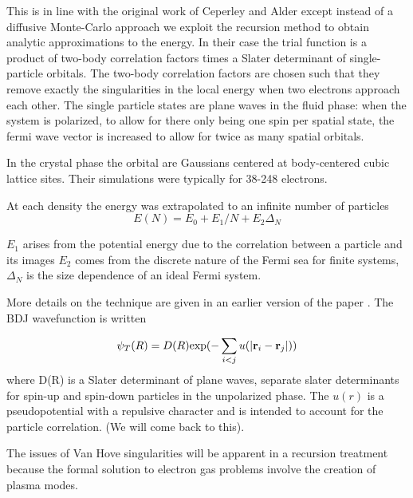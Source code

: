 \documentclass{article}
\def\r{{\bf r}}
\begin{document}
This is in line with the original work of Ceperley and Alder \cite{ceperley80} except 
instead of a diffusive Monte-Carlo approach we exploit the
recursion method to obtain analytic approximations to the energy.
In their case the trial function is a product
of two-body correlation factors times a Slater determinant of 
single-particle orbitals. The two-body correlation factors are
chosen such that they remove exactly the singularities in the local energy when two electrons
approach each other. The single particle states are plane waves
in the fluid phase: when the system is polarized, to allow for there only being
one spin per spatial state, the fermi wave vector is increased to allow
for twice as many spatial orbitals. 

In the crystal phase the orbital are Gaussians centered 
at body-centered cubic lattice sites. Their simulations were typically 
for 38-248 electrons.

At each density the energy was extrapolated to an infinite number of particles
%
\begin{equation}
E(N) = E_{0} + E_{1}/N + E_{2}\Delta_{N}
\end{equation}

$E_{1}$ arises from the potential energy due to the correlation between a particle and its images
$E_{2}$ comes from the discrete nature of the Fermi sea for finite systems, $\Delta_{N}$ is the 
size dependence of an ideal Fermi system.

More details on the technique are given in an earlier version of the paper
\cite{ceperley78}. The BDJ wavefunction is written

\begin{equation}
\psi_{T}(R) = D(R) {\rm exp}(-\sum_{i<j} u(|\r_{i}-\r_{j}|))
\end{equation}
%
where D(R) is a Slater determinant of plane waves, separate slater determinants for
spin-up and spin-down particles in the unpolarized phase. The $u(r)$ is a pseudopotential
with a repulsive character and is intended to account for the particle correlation. 
(We will come back to this).

The issues of Van Hove singularities will be apparent in a recursion treatment because 
the formal solution to electron gas problems involve the creation of plasma modes.
\end{document}
